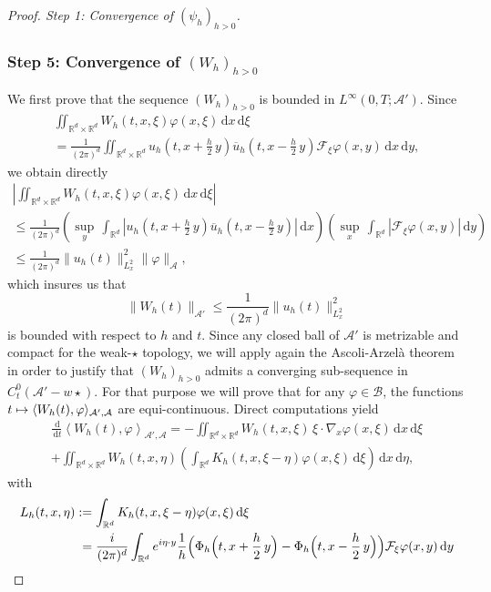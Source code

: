 \documentclass[10pt]{amsart}
\newcommand\mto{\mathchoice{\longmapsto}{\mapsto}{\mapsto}{\mapsto}}
\let\bar\oldbar
\theoremstyle{definition}
\let\bar\overline
\newcommand{\R}{\mathbb{R}}
\newcommand{\ud}{\, {\mathrm{d}}}
\begin{document}
\begin{proof}[Proof. Step 1: Convergence of $(\psi_{h})_{h>0}$]
\subsubsection*{Step 5: Convergence of $(W_{h})_{h>0}$} We first prove that the sequence $(W_{h})_{h>0}$ is bounded in $L^{\infty}\left(0,T;\mathcal{A}'\right)$. Since
\begin{multline*}
\iint_{\R^{d}\times\R^{d}}W_{h}(t,x,\xi)\varphi(x,\xi)\ud x\ud \xi\\
=\frac{1}{(2\pi)^{d}}\iint_{\R^{d}\times\R^{d}}u_{h}(t,x+\frac{h}{2}\,y)\bar{u}_{h}(t,x-\frac{h}{2}\,y)\mathcal{F}_{\xi}\varphi(x,y)\ud x\ud y,
\end{multline*}
we obtain directly
\begin{multline*}
\left|\iint_{\R^{d}\times\R^{d}}W_{h}(t,x,\xi)\varphi(x,\xi)\ud x\ud \xi\right|\\
\leq\frac{1}{(2\pi)^{d}}\left(\underset{y}{\sup}\,\int_{\R^{d}}\left|u_{h}(t,x+\frac{h}{2}\,y)\bar{u}_{h}(t,x-\frac{h}{2}\,y)\right|\ud x\right)\left(\underset{x}{\sup}\,\int_{\R^{d}}|\mathcal{F}_{\xi}\varphi(x,y)|\ud y\right)\\
\leq\frac{1}{(2\pi)^{d}}\|u_{h}(t)\|_{L_{x}^{2}}^{2}\|\varphi\|_{\mathcal{A}},
\end{multline*}
which insures us that
\[
\|W_{h}(t)\|_{\mathcal{A}'}\leq\frac{1}{(2\pi)^{d}}\|u_{h}(t)\|_{L_{x}^{2}}^{2}
\]
is bounded with respect to $h$ and $t$. Since any closed ball of $\mathcal{A}'$ is metrizable and compact for the weak-$\star$ topology, we will apply again the Ascoli-Arzelà theorem in order to justify that $(W_{h})_{h>0}$ admits a converging sub-sequence in $C_{t}^{0}(\mathcal{A}'-w\star)$. For that purpose we will prove that for any $\varphi\in\mathcal{B}$, the functions $t\mto \langle W_{h}(t),\varphi\rangle_{\mathcal{A}',\mathcal{A}}$ are equi-continuous. Direct computations yield
\begin{multline}\label{eq_on_Wh}
\frac{\ud}{\ud t}\left\langle W_{h}(t),\varphi\right\rangle_{\mathcal{A}',\mathcal{A}}=-\iint_{\R^{d}\times\R^{d}}W_{h}(t,x,\xi)\,\xi\cdot\nabla_{x}\varphi(x,\xi)\ud x\ud\xi\\
+\iint_{\R^{d}\times\R^{d}}W_{h}(t,x,\eta)\left(\int_{\R^{d}}K_{h}(t,x,\xi-\eta)\varphi(x,\xi)\ud\xi\right)\ud x\ud\eta,
\end{multline}
with
\begin{align*}
L_{h}(t,x,\eta)&:=\int_{\R^{d}}K_{h}(t,x,\xi-\eta)\varphi(x,\xi)\ud\xi\\
&\hphantom{:}=\frac{i}{(2\pi)^{d}}\int_{\R^{d}}e^{i\eta\cdot y}\frac{1}{h}\Bigl(\Phi_{h}\Bigl(t,x+\frac{h}{2}\,y\Bigr)-\Phi_{h}\Bigl(t,x-\frac{h}{2}\,y\Bigr)\Bigr)\mathcal{F}_{\xi}\varphi(x,y)\ud y

\end{align*}
\end{proof}
\end{document}
